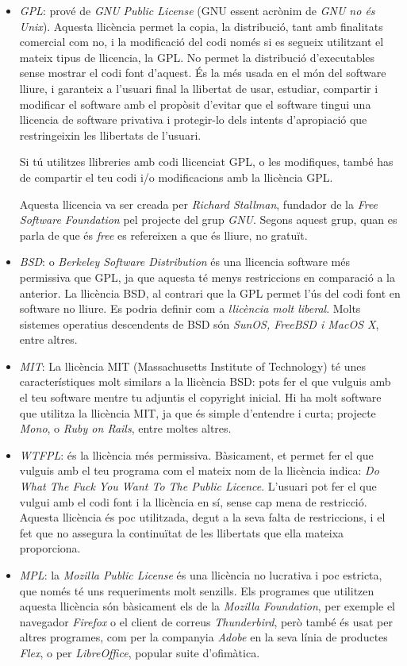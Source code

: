 \begin{itemize}
	\item \emph{GPL}: prové de \emph{GNU Public License} (GNU essent acrònim de
	\emph{GNU no és Unix}). Aquesta 
	llicència permet la copia, la distribució, tant amb finalitats comercial com no, i 
	la modificació del codi només si es segueix utilitzant el mateix 
	tipus de llicencia, la GPL. No permet la distribució d'executables sense mostrar 
	el codi font d'aquest. És la més usada en el món del 
	software lliure, i garanteix a l'usuari final la llibertat de usar, estudiar, compartir 
	i modificar el software amb el propòsit d'evitar que el software tingui una 
	llicencia de software privativa i protegir-lo dels intents d'apropiació que 
	restringeixin les llibertats de l'usuari.
	
	Si tú utilitzes llibreries amb codi llicenciat GPL, o les modifiques, també has de compartir el teu codi i/o modificacions amb la llicència GPL.
	
	Aquesta llicencia va ser creada per
	\emph{Richard Stallman}, fundador de la \emph{Free Software Foundation}
	pel projecte del grup \emph{GNU}.
	Segons aquest grup, quan es parla de que és \textit{free} es refereixen a que és 
	lliure, no gratuït. \cite {gnugpl} \cite {tldr}
	\item \emph{BSD}: o \emph{Berkeley Software Distribution} és una llicencia software més 
	permissiva que GPL, ja que aquesta té menys restriccions en comparació a la 
	anterior. La llicència BSD, al contrari 
	que la GPL permet l'ús del codi font en software no lliure. Es podria definir com a \emph{llicència molt liberal}. Molts sistemes operatius descendents de BSD són \emph{SunOS, 
	FreeBSD i MacOS X}, entre altres. \cite {bsd} \cite {tldr}
	\item \emph{MIT}: La llicència MIT (Massachusetts Institute of Technology)
	té unes característiques molt similars a la llicència BSD:
	pots fer el que vulguis amb el teu software mentre tu adjuntis el copyright 
	inicial. Hi ha molt software que utilitza la llicència MIT, ja que és simple d'entendre i curta; projecte \emph{Mono}, o \emph{Ruby on Rails}, entre moltes altres.\cite {mit} \cite {tldr}
	\item \emph{WTFPL}: és la llicència més permissiva. Bàsicament, et permet fer
	el que vulguis amb el teu programa com el mateix nom de la llicència indica:
	\emph{Do What The Fuck You Want To The Public Licence}.
	L'usuari pot fer el que vulgui amb el codi font i la llicència en sí, sense
	cap mena de restricció. Aquesta llicència és poc utilitzada, degut a la seva
	falta de restriccions, i el fet que no assegura la continuïtat de les llibertats
	que ella mateixa proporciona.\cite {tldr}
	\item \emph{MPL}: la \emph{Mozilla Public License} és una llicència no lucrativa i poc estricta, que només té uns requeriments molt senzills.
	Els programes que utilitzen aquesta llicència són bàsicament els de la \emph{Mozilla Foundation},
	per exemple el navegador \emph{Firefox} o el client de correus \emph{Thunderbird},
	però també és usat per altres programes, com per la companyia \emph{Adobe} en
	la seva línia de productes \emph{Flex}, o per \emph{LibreOffice}, popular suite
	d'ofimàtica. \cite {tldr}
	

\end{itemize}
